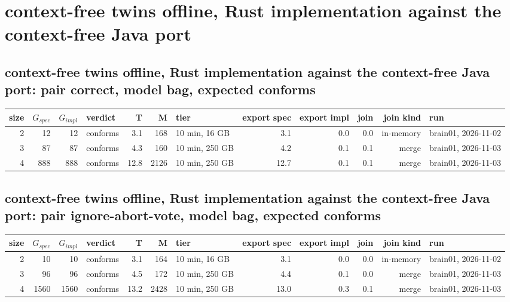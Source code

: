 \documentclass[10pt]{article}
\begin{document}
\section*{context-free twins offline, Rust implementation against the context-free Java port}
\subsection*{context-free twins offline, Rust implementation against the context-free Java port: pair \textsf{correct}, model bag, expected conforms}
\begin{longtable}{@{}rrrlrrlrrrrl@{}}
\toprule
size & $G_{\mathit{spec}}$ & $G_{\mathit{impl}}$ & verdict & T & M & tier & export spec & export impl & join & join kind & run \\
\midrule
\endhead
\color{red} 2 & 12 & 12 & conforms & 3.1 & 168 & 10 min, 16 GB & 3.1 & 0.0 & 0.0 & in-memory & brain01, 2026-11-02 \\
\color{blue} 3 & 87 & 87 & conforms & 4.3 & 160 & 10 min, 250 GB & 4.2 & 0.1 & 0.1 & merge & brain01, 2026-11-03 \\
\color{blue} 4 & 888 & 888 & conforms & 12.8 & 2126 & 10 min, 250 GB & 12.7 & 0.1 & 0.1 & merge & brain01, 2026-11-03 \\
\bottomrule
\end{longtable}
\subsection*{context-free twins offline, Rust implementation against the context-free Java port: pair \textsf{ignore-abort-vote}, model bag, expected conforms}
\begin{longtable}{@{}rrrlrrlrrrrl@{}}
\toprule
size & $G_{\mathit{spec}}$ & $G_{\mathit{impl}}$ & verdict & T & M & tier & export spec & export impl & join & join kind & run \\
\midrule
\endhead
\color{red} 2 & 10 & 10 & conforms & 3.1 & 164 & 10 min, 16 GB & 3.1 & 0.0 & 0.0 & in-memory & brain01, 2026-11-02 \\
\color{blue} 3 & 96 & 96 & conforms & 4.5 & 172 & 10 min, 250 GB & 4.4 & 0.1 & 0.0 & merge & brain01, 2026-11-03 \\
\color{blue} 4 & 1560 & 1560 & conforms & 13.2 & 2428 & 10 min, 250 GB & 13.0 & 0.3 & 0.1 & merge & brain01, 2026-11-03 \\
\bottomrule
\end{longtable}
\end{document}
